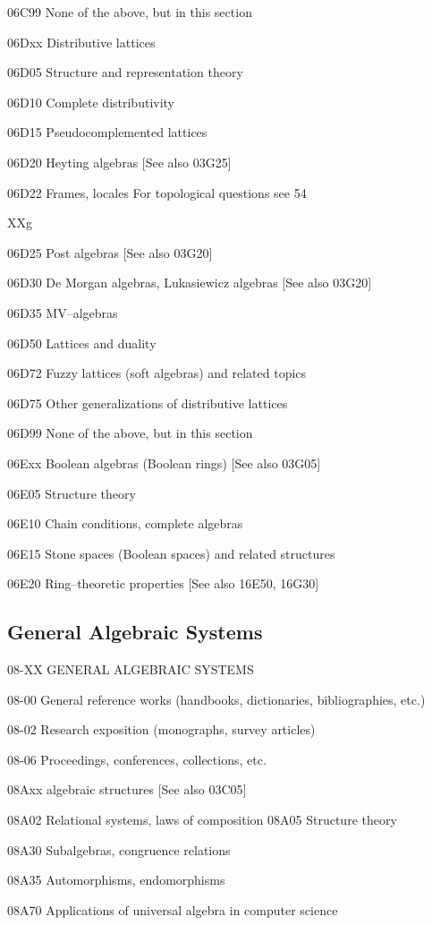 \documentclass[12pt]{article}
\theoremstyle{plain}
\theoremstyle{definition}
\numberwithin{equation}{section}
\begin{document}
06C99 None of the above, but in this section

06Dxx Distributive lattices

06D05 Structure and representation theory

06D10 Complete distributivity

06D15 Pseudocomplemented lattices

06D20 Heyting algebras [See also 03G25]

06D22 Frames, locales For topological questions see 54{XXg

06D25 Post algebras [See also 03G20]

06D30 De Morgan algebras, Lukasiewicz algebras [See also 03G20]

06D35 MV--algebras

06D50 Lattices and duality

06D72 Fuzzy lattices (soft algebras) and related topics

06D75 Other generalizations of distributive lattices

06D99 None of the above, but in this section

06Exx Boolean algebras (Boolean rings) [See also 03G05]

06E05 Structure theory

06E10 Chain conditions, complete algebras

06E15 Stone spaces (Boolean spaces) and related structures

06E20 Ring--theoretic properties [See also 16E50, 16G30]

\subsection{General Algebraic Systems}

08-XX GENERAL ALGEBRAIC SYSTEMS

08-00 General reference works (handbooks, dictionaries, bibliographies, etc.)

08-02 Research exposition (monographs, survey articles)

08-06 Proceedings, conferences, collections, etc.

08Axx algebraic structures [See also 03C05]

08A02 Relational systems, laws of composition 08A05 Structure theory

08A30 Subalgebras, congruence relations

08A35 Automorphisms, endomorphisms

08A70 Applications of universal algebra in computer science

}
\end{document}
